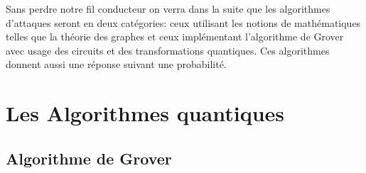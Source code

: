 \documentclass[12pt,openany]{report}
\begin{document}
\noindent\hrulefill
\begin{cautionblock}

Sans perdre notre fil conducteur on verra dans la suite que les algorithmes d'attaques seront en deux catégories: ceux utilisant les notions de mathématiques telles que la théorie des graphes et ceux implémentant l'algorithme de Grover avec usage des circuits et des transformations quantiques. Ces algorithmes donnent aussi une réponse suivant une probabilité.\cite{Grenet}

\end{cautionblock}



\section{Les Algorithmes quantiques}
\subsection{Algorithme de Grover}
\end{document}
